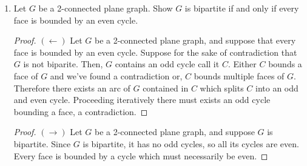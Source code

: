 \documentclass[12pt]{article}
\newcommand{\RR}{\mathbb{R}}
\begin{document}
\begin{enumerate}
		\begin{proof}$\leftarrow$ Suppose $G$ does not contain a $K^4$ minor or a $K_{2, 3}$ minor. Let $G' = G + v$ such that $v$ is a vertex incident to all vertices in $G$. Note $G'$ cannot have a $K_{3, 3}$ or $K_5$ minor, since any such minor would necessarily have to include vertex $v$, as $G$ has no $K^4$ minor or a $K_{2, 3}$ minor however, such a minor in $G'$ would imply the existence of a $K^4$ minor or a $K_{2, 3}$ minor in $G$. By Kuratowski's Theorem $G'$ is planar, furthermore there exists an embedding of $G'$, call it $\iota$, where $v$ is contained in the outer face of $G$ (this can be shown via a composition of homeomorphisms $\phi : \RR^2 \to S^{2,*}$ and $\rho : S^{2,*} \to S^{2,*}$ where $\rho$ moves the hole to the outer face of $G$). Now consider removing $v$ from $\iota(G')$, and since $v$ is contained in the outer face of $G$, $\iota(G') - v$ is now an outerplanar embedding of $G$.   
		
	\end{proof}
	\newpage
	
	









	\item Let $G$ be a 2-connected plane graph. Show $G$ is bipartite if and only if every face is bounded by an even cycle. 
	\begin{proof} $(\leftarrow)$ Let $G$ be a 2-connected plane graph, and suppose that every face is bounded by an even cycle. Suppose for the sake of contradiction that $G$ is not biparite. Then, $G$ contains an odd cycle call it $C$. Either $C$ bounds a face of $G$ and we've found a contradiction or, $C$ bounds multiple faces of $G$. Therefore there exists an arc of $G$ contained in $C$ which splits $C$  into an odd and even cycle. Proceeding iteratively there must exists an odd cycle bounding a face, a contradiction. 
 	\end{proof}

	\begin{proof}$(\rightarrow)$ Let $G$ be a 2-connected plane graph, and suppose $G$ is bipartite. Since $G$ is bipartite, it has no odd cycles, so all its cycles are even. Every face is bounded by a cycle which must necessarily be even. 
	\end{proof}
	\newpage












\end{enumerate}
\end{document}
